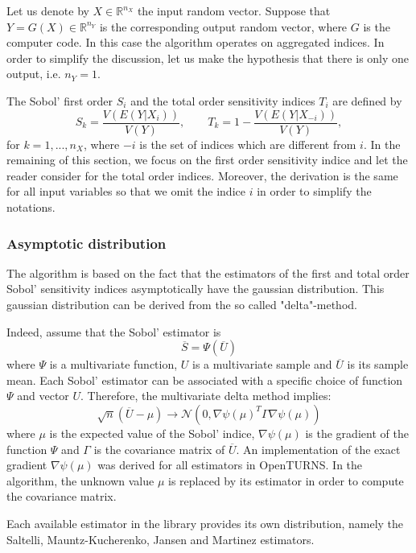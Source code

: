 \documentclass{uncecomp2019}
\begin{document}
Let us denote by $X\in\mathbb{R}^{n_X}$ the input random vector.
Suppose that $Y=G(X) \in\mathbb{R}^{n_Y}$ is the corresponding output random vector, 
where $G$ is the computer code. 
In this case the algorithm operates on aggregated indices. 
In order to simplify the discussion, let us make the hypothesis that there is 
only one output, i.e. $n_Y=1$. 

The Sobol' first order $S_i$ and 
the total order sensitivity indices $T_i$ are defined by 
$$
S_k = \frac{V(E(Y|X_i))}{V(Y)}, \qquad 
T_k = 1 - \frac{V\left(E\left(Y|X_{-i}\right)\right)}{V(Y)}, 
$$
for $k=1,...,n_X$, 
where $-i$ is the set of indices which are different from $i$. 
In the remaining of this section, 
we focus on the first order sensitivity indice and let the reader consider \cite{RapportSobol2018} for the total 
order indices. 
Moreover, the derivation is the same for all input variables so that we omit the 
indice $i$ in order to simplify the notations. 


\subsubsection{Asymptotic distribution}

The algorithm is based on the fact that the estimators of the 
first and total order Sobol' sensitivity indices 
asymptotically have the gaussian distribution. 
This gaussian distribution can be derived from the 
so called "delta"-method. 

Indeed, assume that the Sobol' estimator is 
$$
\overline{S} = \Psi\left(\overline{U}\right)
$$
where $\Psi$ is a multivariate function, $U$ is a multivariate sample and $\overline{U}$ is its 
sample mean. 
Each Sobol' estimator can be associated with a specific choice of function $\Psi$ 
and vector $U$. 
Therefore, the multivariate delta method implies:
$$
\sqrt{n} \left(\overline{U} - \mu\right) \rightarrow \mathcal{N}\left(0,\nabla \psi(\mu)^T \Gamma\nabla \psi(\mu)\right)
$$
where $\mu$ is the expected value of the Sobol' indice, $\nabla \psi(\mu)$ is the 
gradient of the function $\Psi$ and $\Gamma$ is the covariance matrix of 
$\overline{U}$. 
An implementation of the exact gradient $\nabla \psi(\mu)$ was derived for all estimators in OpenTURNS.  
In the algorithm, the unknown value $\mu$ is replaced by its estimator in order to 
compute the covariance matrix. 

Each available estimator in the library provides its own distribution, namely 
the Saltelli, Mauntz-Kucherenko, Jansen and Martinez estimators.
\end{document}
